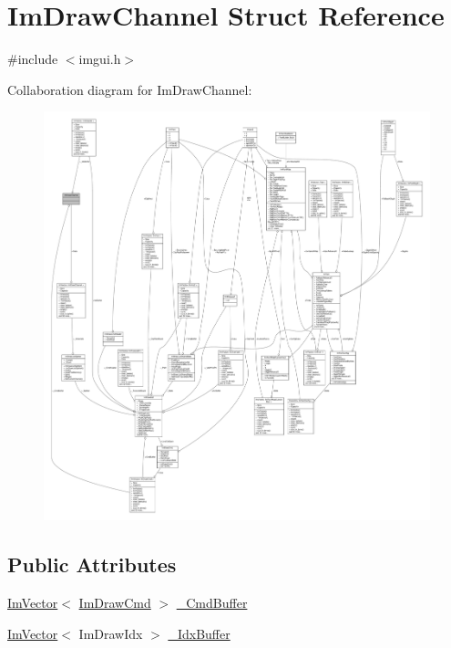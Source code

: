 \hypertarget{structImDrawChannel}{}\section{Im\+Draw\+Channel Struct Reference}
\label{structImDrawChannel}


{\ttfamily \#include $<$imgui.\+h$>$}



Collaboration diagram for Im\+Draw\+Channel\+:
\nopagebreak
\begin{figure}[H]
\begin{center}
\leavevmode
\includegraphics[width=350pt]{structImDrawChannel__coll__graph}
\end{center}
\end{figure}
\subsection*{Public Attributes}
\begin{DoxyCompactItemize}
\item 
\hyperlink{structImVector}{Im\+Vector}$<$ \hyperlink{structImDrawCmd}{Im\+Draw\+Cmd} $>$ \hyperlink{structImDrawChannel_a8bb018bc09e2a1f4389c78390a437f78}{\+\_\+\+Cmd\+Buffer}
\item 
\hyperlink{structImVector}{Im\+Vector}$<$ Im\+Draw\+Idx $>$ \hyperlink{structImDrawChannel_abf48aaacbb4908d4b1ff8b54ee85a45f}{\+\_\+\+Idx\+Buffer}
\end{DoxyCompactItemize}


